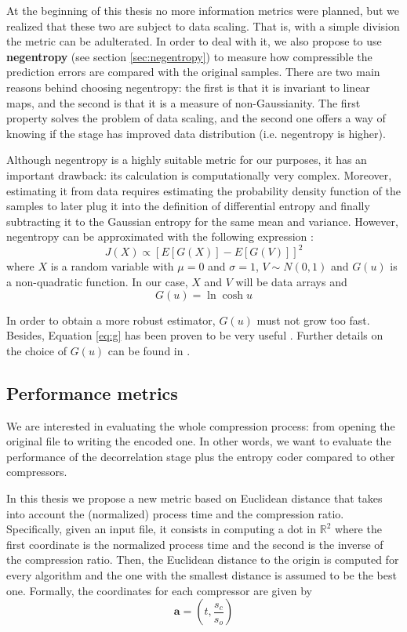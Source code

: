 At the beginning of this thesis no more information metrics were planned, but we realized that these two are subject to data scaling. That is, with a simple division the metric can be adulterated. In order to deal with it, we also propose to use \textbf{negentropy} (see section \ref{sec:negentropy}) to measure how compressible the prediction errors are compared with the original samples. There are two main reasons behind choosing negentropy: the first is that it is invariant to linear maps, and the second is that it is a measure of non-Gaussianity. The first property solves the problem of data scaling, and the second one offers a way of knowing if the stage has improved data distribution (i.e. negentropy is higher).

Although negentropy is a highly suitable metric for our purposes, it has an important drawback: its calculation is computationally very complex. Moreover, estimating it from data requires estimating the probability density function of the samples to later plug it into the definition of differential entropy and finally subtracting it to the Gaussian entropy for the same mean and variance. However, negentropy can be approximated with the following expression \parencite{HYVARINEN2000411}:
\begin{equation}
J(X) \propto \left[E[G(X)] - E[G(V)]\right]^2
\end{equation}
where $X$ is a random variable with $\mu = 0$ and $\sigma = 1$, $V \sim N(0,1)$ and $G(u)$ is a non-quadratic function. In our case, $X$ and $V$ will be data arrays and
\begin{equation} \label{eq:g}
G(u) = \ln \cosh u
\end{equation}

In order to obtain a more robust estimator, $G(u)$ must not grow too fast. Besides, Equation \ref{eq:g} has been proven to be very useful \parencite{HYVARINEN2000411}. Further details on the choice of $G(u)$ can be found in \parencite{NIPS1997_6d9c547c}. 

\subsection{Performance metrics} \label{sec:euclidean}
We are interested in evaluating the whole compression process: from opening the original file to writing the encoded one. In other words, we want to evaluate the performance of the decorrelation stage plus the entropy coder compared to other compressors.

In this thesis we propose a new metric based on Euclidean distance that takes into account the (normalized) process time and the compression ratio. Specifically, given an input file, it consists in computing a dot in $\mathbb{R}^2$ where the first coordinate is the normalized process time and the second is the inverse of the compression ratio. Then, the Euclidean distance to the origin is computed for every algorithm and the one with the smallest distance is assumed to be the best one. Formally, the coordinates for each compressor are given by
\begin{equation} \label{eq:dot_comp}
\mathbf{a} = \left(t, \frac{s_c}{s_o}\right)
\end{equation}

